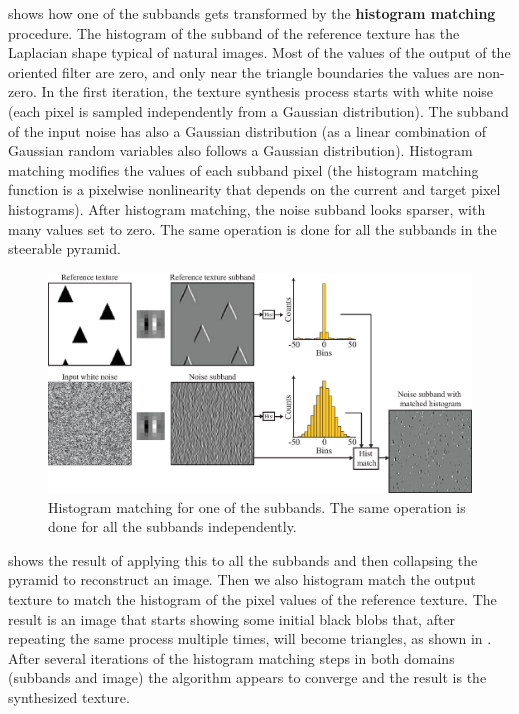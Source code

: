 { \Fig{\ref{fig:heegersubbands_histmatch}} shows how one of the subbands gets transformed by the {\bf histogram matching} procedure. 
 The histogram of the subband of the reference texture has the Laplacian shape typical of natural images. Most of the values of the output of the oriented filter are zero, and only near the triangle boundaries the values are non-zero. In the first iteration, the texture synthesis process starts with white noise (each pixel is sampled independently from a Gaussian distribution). The subband of the input noise has also a Gaussian distribution (as a linear combination of Gaussian random variables also follows a Gaussian distribution). Histogram matching modifies the values of each subband pixel (the histogram matching function is a pixelwise nonlinearity that depends on the current and target pixel histograms). After histogram matching, the noise subband looks sparser, with many values set to zero. The same operation is done for all the subbands in the steerable pyramid. 
 
 
 
 
\begin{figure}[t]
\centerline{
\includegraphics[width=1\linewidth]{figures/heeger_bergen/heeger_bergen_one_subband_tmp.eps}
}
\caption{Histogram matching for one of the subbands. The same operation is done for all the subbands independently.}
\label{fig:heegersubbands_histmatch}
\end{figure}
 
 shows the result of applying this to all the subbands and then collapsing the pyramid to reconstruct an image. Then we also histogram match the output texture to match the histogram of the pixel values of the reference texture. The result is an image that starts showing some initial black blobs that, after repeating the same process multiple times, will become triangles, as shown in \fig{\ref{fig:heeger_bergen_iterations}}.  After several iterations of the histogram matching steps in both domains (subbands and image) the algorithm appears to converge and the result is the synthesized texture.




}

